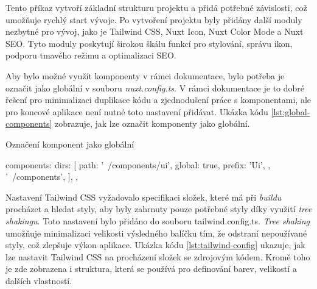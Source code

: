 Tento příkaz vytvoří základní strukturu projektu a přidá potřebné závislosti, což umožňuje rychlý start vývoje. Po vytvoření projektu byly přidány další moduly nezbytné pro vývoj, jako je Tailwind CSS, Nuxt Icon, Nuxt Color Mode a Nuxt SEO. Tyto moduly poskytují širokou škálu funkcí pro stylování, správu ikon, podporu tmavého režimu a optimalizaci SEO.

Aby bylo možné využít komponenty v rámci dokumentace, bylo potřeba je označit jako globální v souboru \emph{nuxt.config.ts}. V rámci dokumentace je to dobré řešení pro minimalizaci duplikace kódu a zjednodušení práce s komponentami, ale pro koncové aplikace není nutné toto nastavení přidávat. Ukázka kódu \ref{lst:global-components} zobrazuje, jak lze označit komponenty jako globální.

\begin{listing}[h]
    \caption{Označení komponent jako globální}
    \label{lst:global-components}
    \begin{code}
components: {
  dirs: [
    {
      path: '~/components/ui',
      global: true,
      prefix: 'Ui',
    },
    '~/components',
  ],
},
\end{code}
\end{listing}

Nastavení Tailwind CSS vyžadovalo specifikaci složek, které má při \emph{buildu} procházet a hledat styly, aby byly zahrnuty pouze potřebné styly díky využití \emph{tree shakingu}. Toto nastavení bylo přidáno do souboru tailwind.config.ts. \emph{Tree shaking} umožňuje minimalizaci velikosti výsledného balíčku tím, že odstraní nepoužívané styly, což zlepšuje výkon aplikace. Ukázka kódu \ref{lst:tailwind-config} ukazuje, jak lze nastavit Tailwind CSS na procházení složek se zdrojovým kódem. Kromě toho je zde zobrazena i struktura, která se používá pro definování barev, velikostí a dalších vlastností.

